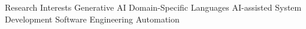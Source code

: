 \begin{rubric}{Research Interests}
\entry*[] Generative AI
\entry*[] Domain-Specific Languages
\entry*[] AI-assisted System Development
\entry*[] Software Engineering Automation
\end{rubric}